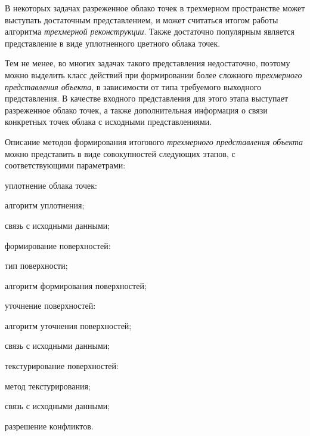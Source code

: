 В некоторых задачах разреженное облако точек в трехмерном пространстве может выступать достаточным представлением, и может считаться итогом работы алгоритма \textit{трехмерной реконструкции}. Также достаточно популярным является представление в виде уплотненного цветного облака точек.

Тем не менее, во многих задачах такого представления недостаточно, поэтому можно выделить класс действий при формировании более сложного \textit{трехмерного представления объекта}, в зависимости от типа требуемого выходного представления. В качестве входного представления для этого этапа выступает разреженное облако точек, а также дополнительная информация о связи конкретных точек облака с исходными представлениями.

Описание методов формирования итогового \textit{трехмерного представления объекта} можно представить в виде совокупностей следующих этапов, с соответствующими параметрами:
\begin{textitemize}
    \item уплотнение облака точек:
    \begin{textitemize}
        \item алгоритм уплотнения;
        \item связь с исходными данными;
    \end{textitemize}
    \item формирование поверхностей:
    \begin{textitemize}
        \item тип поверхности;
        \item алгоритм формирования поверхностей;
    \end{textitemize}
    \item уточнение поверхностей:
    \begin{textitemize}
        \item алгоритм уточнения поверхностей;
        \item связь с исходными данными;
    \end{textitemize}
    \item текстурирование поверхностей:
    \begin{textitemize}
        \item метод текстурирования;
        \item связь с исходными данными;
        \item разрешение конфликтов.
    \end{textitemize}
\end{textitemize}

